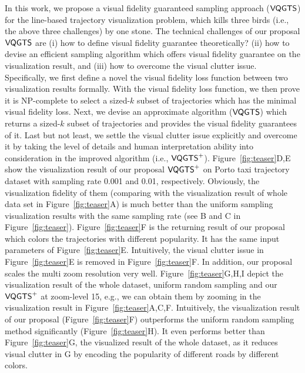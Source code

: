 In this work, we propose a visual fidelity guaranteed sampling approach ($\mathsf{VQGTS}{}$) for the line-based trajectory visualization problem,
which kills three birds (i.e., the above three challenges) by one stone.
The technical challenges of our proposal $\mathsf{VQGTS}{}$ are 
(i) how to define visual fidelity guarantee theoretically?
(ii) how to devise an efficient sampling algorithm which offers visual fidelity guarantee on the visualization result,
and (iii) how to overcome the visual clutter issue.
Specifically, we first define a novel the visual fidelity loss function between two visualization results formally.
With the visual fidelity loss function, we then prove it is NP-complete to select a sized-$k$ subset of trajectories which has the minimal visual fidelity loss.
Next, we devise an approximate algorithm ($\mathsf{VQGTS}$) which returns a sized-$k$ subset of trajectories and provides the visual fidelity guarantees of it.
Last but not least, we settle the visual clutter issue explicitly and overcome it by taking the level of details and human interpretation ability into consideration in the improved algorithm (i.e., $\mathsf{VQGTS}^{+}$).
Figure~\ref{fig:teaser}D,E show the visualization result of our proposal $\mathsf{VQGTS}^{+}{}$ on Porto taxi trajectory dataset with sampling rate 0.001 and 0.01, respectively.
Obviously, the visualization fidelity of them (comparing with the visualization result of whole data set in Figure~\ref{fig:teaser}A) is much better than 
the uniform sampling visualization results with the same sampling rate  (see B and C in Figure~\ref{fig:teaser}).
Figure~\ref{fig:teaser}F is the returning result of our proposal which colors the trajectories with different popularity.
It has the same input parameters of Figure~\ref{fig:teaser}E. 
Intuitively, the visual clutter issue in Figure~\ref{fig:teaser}E is  removed in Figure~\ref{fig:teaser}F.
In addition, our proposal scales the multi zoom resolution very well.
Figure~\ref{fig:teaser}G,H,I depict the visualization result of the whole dataset, uniform random sampling and our $\mathsf{VQGTS}^{+}$ at zoom-level 15,
e.g., we can obtain them by zooming in the visualization result in Figure~\ref{fig:teaser}A,C,F.
Intuitively, the visualization result of our proposal (Figure~\ref{fig:teaser}F) outperforms the uniform random sampling method significantly (Figure~\ref{fig:teaser}H).
It even performs better than Figure~\ref{fig:teaser}G, the visualized result of the whole dataset, as it reduces visual clutter in G by encoding the popularity of different roads by different colors.

